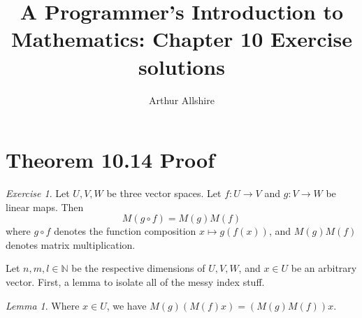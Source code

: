 \documentclass{article}
\author{Arthur Allshire}
\title{A Programmer's Introduction to Mathematics: Chapter 10 Exercise solutions}
\theoremstyle{remark}
\newtheorem*{exercise}{Exercise}
\newtheorem*{lemma}{Lemma}
\begin{document}
\maketitle

\section*{Theorem 10.14 Proof}
\begin{exercise}
    Let $U, V, W$ be three vector spaces. Let $f: U \rightarrow V$ and $g: V \rightarrow W$ be linear maps. Then
\[
    M(g \circ f) = M(g)M(f)
\]
where $g \circ f$ denotes the function composition $x \mapsto g(f(x))$, and $M(g)M(f)$ denotes matrix multiplication.
\end{exercise}
Let $n,m,l \in \mathbb{N}$ be the respective dimensions of $U, V, W$, and
$x \in U$ be an arbitrary vector. First, a lemma to isolate all of the messy index stuff.

\begin{lemma}
Where $x \in U$, we have $M(g)(M(f)x) = (M(g)M(f))x$.
\end{lemma}
\end{document}
